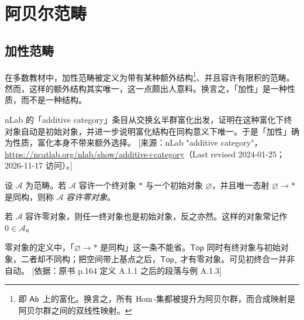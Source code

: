 
\providecommand{\coim}{\operatorname{coim}}

\section{阿贝尔范畴}\label{sec:A}

\subsection{加性范畴}\label{sec:A.1}

在多数教材中，加性范畴被定义为带有某种额外结构\footnote{即 $\mathsf{Ab}$ 上的富化。换言之，所有 $\operatorname{Hom}$-集都被提升为阿贝尔群，而合成映射是阿贝尔群之间的双线性映射。}、并且容许有限积的范畴。然而，这样的额外结构其实唯一，这一点颇出人意料。换言之，「加性」是一种性质，而不是一种结构。

\begin{yizhu}
nLab 的「additive category」条目从交换幺半群富化出发，证明在这种富化下终对象自动是初始对象，并进一步说明富化结构在同构意义下唯一。于是「加性」确为性质，富化本身不带来额外选择。
[来源：nLab "additive category"，\url{https://ncatlab.org/nlab/show/additive+category}（Last revised 2024-01-25；2026-11-17 访问）。]
\end{yizhu}

\begin{definition}\label{def:A.1.1}
设 $\mathcal{A}$ 为范畴。若 $\mathcal{A}$ 容许一个终对象 $*$ 与一个初始对象 $\varnothing$，并且唯一态射 $\varnothing\to *$ 是同构，则称 $\mathcal{A}$ \emph{容许零对象}。
\end{definition}

若 $\mathcal{A}$ 容许零对象，则任一终对象也是初始对象，反之亦然。这样的对象常记作 $0\in\mathcal{A}$。

\begin{yizhu}
零对象的定义中，「$\varnothing\to *$ 是同构」这一条不能省。$\mathsf{Top}$ 同时有终对象与初始对象，二者却不同构；把空间带上基点之后，$\mathsf{Top}_*$ 才有零对象。可见初终合一并非自动。
[依据：原书 p.164 定义 A.1.1 之后的段落与例 A.1.3]
\end{yizhu}


